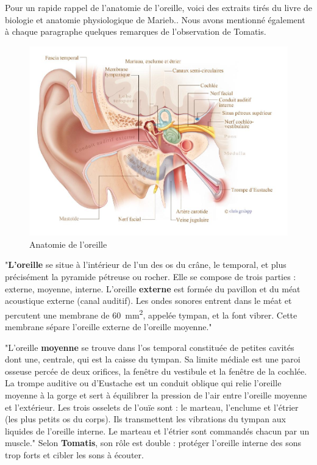 Pour un rapide rappel de l'anatomie de l'oreille, voici des extraits tirés du livre de biologie et anatomie
physiologique de  Marieb.\autocite {marieb:biologie}. Nous avons mentionné également à chaque 
paragraphe quelques  remarques de l'observation de Tomatis.
\begin{figure}
	\centering
	\includegraphics[width=1\linewidth]{images/20160624Berufsfeldgruppen.jpg}
	\caption[Anatomie oreille]{Anatomie de l'oreille}
	\label{fig:-20160624berufsfeldgruppen}
\end{figure}

"\textbf{L'oreille}
se situe à l'intérieur de l'un des os du crâne, le temporal, et plus précisément la pyramide pétreuse ou rocher. Elle se compose de trois parties : externe, moyenne, interne.
L'oreille \textbf{externe} 
est formée du pavillon et du méat acoustique externe
	(canal auditif). Les ondes sonores entrent dans le méat et percutent
	une membrane de \SI{60}{\milli\metre\squared}, appelée tympan, et la font vibrer.
	Cette membrane
	sépare l'oreille externe de l'oreille moyenne."

"L'oreille \textbf{moyenne }se trouve dans l'os temporal constituée de petites
cavités dont une, centrale, qui est la caisse du tympan. Sa limite
médiale est une paroi osseuse percée de deux orifices, la fenêtre
du vestibule et la fenêtre de la cochlée. La trompe auditive ou d'Eustache
est un conduit oblique qui relie l'oreille moyenne à la gorge et sert
à équilibrer la pression de l'air entre l'oreille moyenne et l'extérieur.
Les trois osselets de l'ouïe sont : le marteau, l'enclume et l'étrier
(les plus petits os du corps). Ils transmettent les vibrations du
tympan aux liquides de l'oreille interne.
Le marteau et l'étrier sont commandés chacun par un muscle."\autocite[ch. 8, pp. 
319--321.]{marieb:biologie}
Selon \textbf{Tomatis}, son rôle est double : protéger l'oreille interne des sons
trop forts et cibler les sons à écouter.

